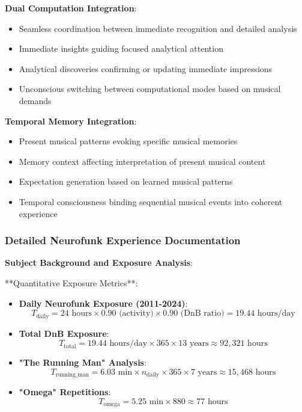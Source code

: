 \documentclass[12pt,a4paper]{article}
\begin{document}
\textbf{Dual Computation Integration}:
\begin{itemize}
\item Seamless coordination between immediate recognition and detailed analysis
\item Immediate insights guiding focused analytical attention
\item Analytical discoveries confirming or updating immediate impressions
\item Unconscious switching between computational modes based on musical demands
\end{itemize}

\textbf{Temporal Memory Integration}:
\begin{itemize}
\item Present musical patterns evoking specific musical memories
\item Memory context affecting interpretation of present musical content
\item Expectation generation based on learned musical patterns
\item Temporal consciousness binding sequential musical events into coherent experience
\end{itemize}

\subsubsection{Detailed Neurofunk Experience Documentation}

\textbf{Subject Background and Exposure Analysis}:

**Quantitative Exposure Metrics**:
\begin{itemize}
\item \textbf{Daily Neurofunk Exposure (2011-2024)}:
$$T_{\text{daily}} = 24 \text{ hours} \times 0.90 \text{ (activity)} \times 0.90 \text{ (DnB ratio)} = 19.44 \text{ hours/day}$$

\item \textbf{Total DnB Exposure}:
$$T_{\text{total}} = 19.44 \text{ hours/day} \times 365 \times 13 \text{ years} \approx 92,321 \text{ hours}$$

\item \textbf{"The Running Man" Analysis}:
$$T_{\text{running\_man}} = 6.03 \text{ min} \times n_{\text{daily}} \times 365 \times 7 \text{ years} \approx 15,468 \text{ hours}$$

\item \textbf{"Omega" Repetitions}:
$$T_{\text{omega}} = 5.25 \text{ min} \times 880 \approx 77 \text{ hours}$$
\end{itemize}
\end{document}

